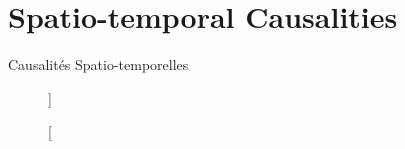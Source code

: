 





\section{Spatio-temporal Causalities}{Causalités Spatio-temporelles}



\begin{figure}
\caption[][]{}{}
\end{figure}







